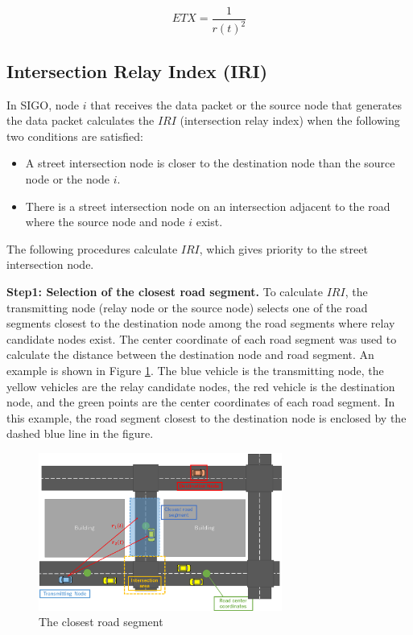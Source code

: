 \documentclass[conference]{IEEEtran}
\begin{document}
 \begin{equation}
 \label{equ-intersection}
 ETX = \frac{1}{  {r(t)}^{2}   } 
 \end{equation}


\subsection{Intersection Relay Index (IRI)}

In SIGO, node $i$ that receives the data packet or the  source node that generates the data packet calculates the 
$IRI$ (intersection relay index) when the following two conditions are satisfied:
\begin{itemize}
\item A street intersection node is closer to the destination node than the source node or the node $i$.
\item There is a street intersection node on an intersection adjacent to the road where the source node and node $i$ exist.
\end{itemize}

The following procedures calculate $IRI$, which gives priority to  the street intersection node.

\textbf{Step1: Selection of the closest road segment.}
To calculate $IRI$, the transmitting node (relay node or the source node) selects one of the road segments closest to the destination node among the road segments where relay candidate nodes exist.
The center coordinate of each road segment was used to calculate the distance between the destination node and road segment. An example is shown in Figure \ref{fig:closest_road}.
The blue vehicle is the transmitting node, the yellow vehicles are the relay candidate nodes, the red vehicle is the destination node, and the green points are the center coordinates of each road segment. In this example, the road segment closest to the destination node is  enclosed by the dashed blue line in the figure.

\begin{figure}[!ht]
\centering
\includegraphics[width=80mm]{figures/closest_road.eps}
\caption{The closest road segment}
\label{fig:closest_road}
\end{figure}
\end{document}
